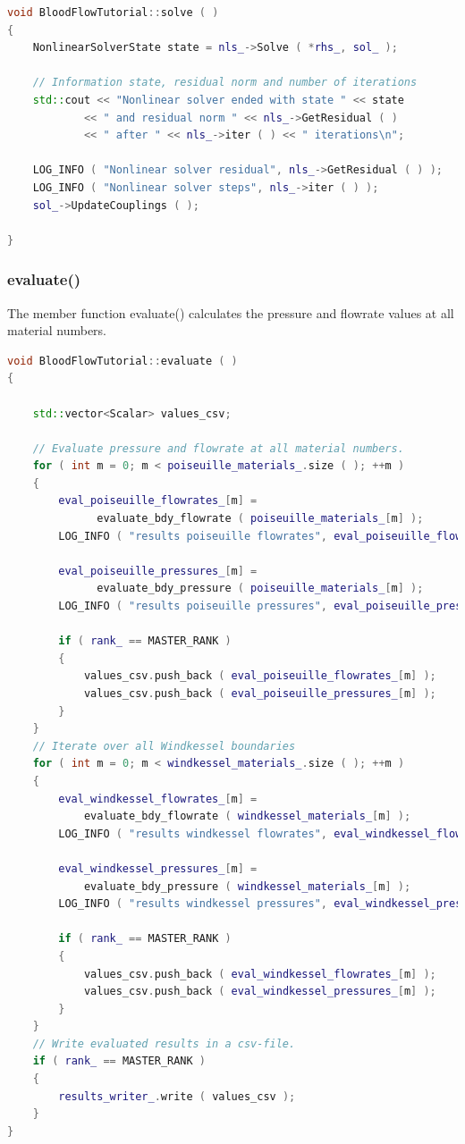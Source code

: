 \documentclass[a4paper, 11pt, twoside]{article}
\begin{document}
\begin{lstlisting}[language=C++, basicstyle={\footnotesize, \ttfamily}, keywordstyle=\color{blue},  numbers=none, tabsize=4]
void BloodFlowTutorial::solve ( )
{
    NonlinearSolverState state = nls_->Solve ( *rhs_, sol_ );

    // Information state, residual norm and number of iterations
    std::cout << "Nonlinear solver ended with state " << state
            << " and residual norm " << nls_->GetResidual ( )
            << " after " << nls_->iter ( ) << " iterations\n";

    LOG_INFO ( "Nonlinear solver residual", nls_->GetResidual ( ) );
    LOG_INFO ( "Nonlinear solver steps", nls_->iter ( ) );
    sol_->UpdateCouplings ( );

}
\end{lstlisting}

\subsubsection{evaluate()}
The member function evaluate() calculates the pressure and flowrate values at all material numbers.

\begin{lstlisting}[language=C++, basicstyle={\footnotesize, \ttfamily}, keywordstyle=\color{blue},  numbers=none, tabsize=4]
void BloodFlowTutorial::evaluate ( )
{

    std::vector<Scalar> values_csv;

    // Evaluate pressure and flowrate at all material numbers.
    for ( int m = 0; m < poiseuille_materials_.size ( ); ++m )
    {
        eval_poiseuille_flowrates_[m] =
              evaluate_bdy_flowrate ( poiseuille_materials_[m] );
        LOG_INFO ( "results poiseuille flowrates", eval_poiseuille_flowrates_[m] );

        eval_poiseuille_pressures_[m] = 
        	  evaluate_bdy_pressure ( poiseuille_materials_[m] );
        LOG_INFO ( "results poiseuille pressures", eval_poiseuille_pressures_[m] );

        if ( rank_ == MASTER_RANK )
        {
            values_csv.push_back ( eval_poiseuille_flowrates_[m] );
            values_csv.push_back ( eval_poiseuille_pressures_[m] );
        }
    }
    // Iterate over all Windkessel boundaries
    for ( int m = 0; m < windkessel_materials_.size ( ); ++m )
    {
        eval_windkessel_flowrates_[m] = 
            evaluate_bdy_flowrate ( windkessel_materials_[m] );
        LOG_INFO ( "results windkessel flowrates", eval_windkessel_flowrates_[m] );

        eval_windkessel_pressures_[m] = 
            evaluate_bdy_pressure ( windkessel_materials_[m] );
        LOG_INFO ( "results windkessel pressures", eval_windkessel_pressures_[m] );

        if ( rank_ == MASTER_RANK )
        {
            values_csv.push_back ( eval_windkessel_flowrates_[m] );
            values_csv.push_back ( eval_windkessel_pressures_[m] );
        }
    }
    // Write evaluated results in a csv-file.
    if ( rank_ == MASTER_RANK )
    {
        results_writer_.write ( values_csv );
    }
}
\end{lstlisting}
\end{document}

